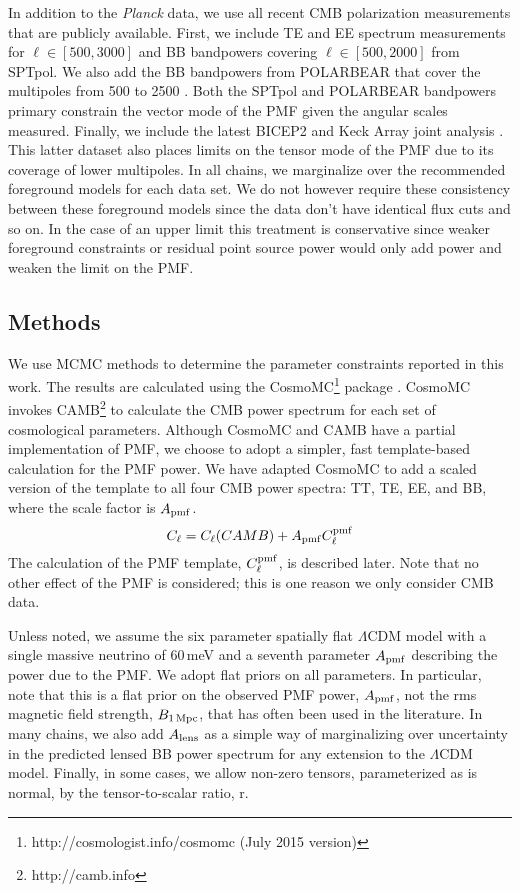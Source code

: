 \documentclass[preprint]{emulateapj}
\newcommand{\cpmf}{\ensuremath{C_{\ell}^{\rm pmf}}}
\newcommand{\apmf}{\ensuremath{A_{\rm pmf}}}
\newcommand{\bpmf}{\ensuremath{B_{\rm 1\,Mpc}}}
\newcommand{\alens}{\ensuremath{A_{\rm lens}}}
\newcommand{\lcdm}{\ensuremath{\Lambda}CDM}
\newcommand{\be}{\begin{equation}}
\newcommand{\ee}{\end{equation}}
\newcommand{\planck}{{\sl Planck}}
\newcommand{\pb}{POLARBEAR}
\newcommand{\sptpol}{SPTpol}
\begin{document}
In addition to the \planck{} data, we use all recent CMB polarization measurements that are publicly available. 
First, we include TE and EE spectrum measurements\citep{crites15} for $\ell \in [500,3000]$ and BB bandpowers covering $\ell \in [500,2000]$ \citep{keisler15} from SPTpol. 
We also add the BB bandpowers from \pb{} that cover the multipoles from 500 to 2500 \citep{polarbear14b}. 
Both the \sptpol{} and \pb{} bandpowers primary constrain the vector mode of the PMF given the angular scales measured. 
Finally, we include the latest BICEP2 and Keck Array  joint analysis \citep{bicepkeck15}. 
This latter dataset also places limits on the tensor mode of the PMF due to its coverage of lower multipoles. 
In all chains, we marginalize over the recommended foreground models for each data set. 
We do not however require these consistency between these foreground models since the data don't have identical flux cuts and so on. 
In the case of an upper limit this treatment is conservative since weaker foreground constraints or residual point source power would only add power and weaken the limit on the PMF. 

\subsection{Methods}

We use MCMC methods to determine the parameter constraints reported in this work. 
The results are calculated using  the {\textsc CosmoMC}\footnote{http://cosmologist.info/cosmomc (July 2015 version)} package \citep{lewis02b}. 
CosmoMC invokes  CAMB\footnote{http://camb.info}  \citep{lewis00} to calculate the CMB power spectrum for each set of cosmological parameters. 
Although CosmoMC and CAMB have a partial implementation of PMF, we choose to adopt a simpler, fast template-based calculation for the PMF power. 
We have adapted CosmoMC to add a scaled version of the template to all four CMB power spectra: TT, TE, EE, and BB, where the scale factor is \apmf. 
\be
C_\ell = C_\ell (CAMB) + \apmf \cpmf
\ee
The calculation of the PMF template, \cpmf, is described later. 
Note that no other effect of the PMF is considered; this is one reason we only consider CMB data.

Unless noted, we assume the six parameter spatially flat \lcdm{} model with a single massive neutrino of 60\,meV and a seventh parameter \apmf{} describing the power due to the PMF. 
We adopt flat priors on all parameters. 
In particular, note that this is a flat prior on the observed PMF power, $\apmf$, not the rms magnetic field strength, \bpmf, that has often been used in the literature. 
In many chains, we also add \alens{} as a simple way of marginalizing over uncertainty in the predicted lensed BB power spectrum for any extension to the \lcdm{} model. 
Finally, in some cases, we allow non-zero tensors, parameterized as is normal, by the tensor-to-scalar ratio, r. 
\end{document}
